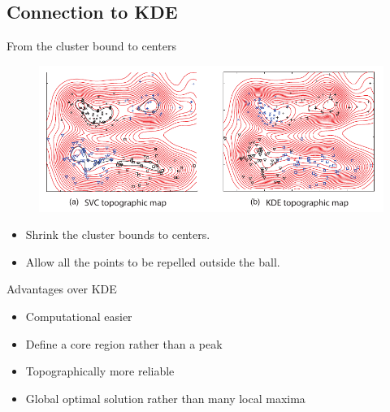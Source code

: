 \subsection{Connection to KDE}
\begin{frame}{From the cluster bound to centers}
\begin{figure}
\centering
\includegraphics[scale=0.7]{imgs/svc_kde.pdf}
\end{figure}
\begin{itemize}
\item Shrink the cluster bounds to centers.
\item Allow all the points to be repelled outside the ball.
\end{itemize}
\end{frame}
\begin{frame}{Advantages over KDE}
\begin{itemize}
\item Computational easier
\item Define a core region rather than a peak
\item Topographically more reliable
\item Global optimal solution rather than many local maxima  
\end{itemize}
\end{frame}

